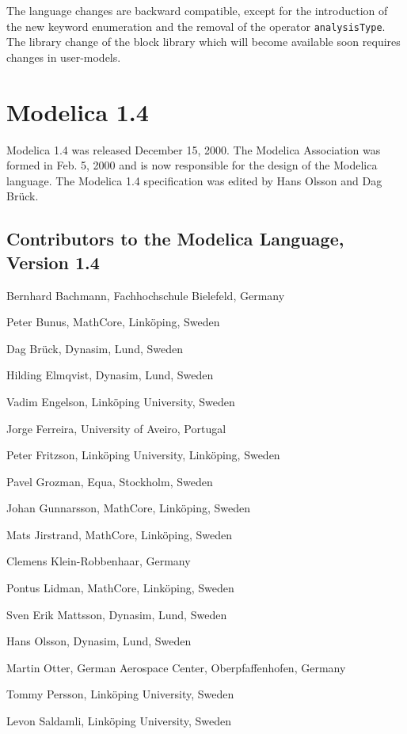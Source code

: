 The language changes are backward compatible, except for the introduction of the new keyword enumeration and the removal of the operator \lstinline!analysisType!.  The library change of the block library which will become available soon requires changes in user-models.

\section{Modelica 1.4}\label{modelica-1-4}

Modelica 1.4 was released December 15, 2000. The Modelica Association
was formed in Feb. 5, 2000 and is now responsible for the design of the
Modelica language. The Modelica 1.4 specification was edited by Hans
Olsson and Dag Brück.

\subsection{Contributors to the Modelica Language, Version 1.4}\label{contributors-to-the-modelica-language-version-1-4}

\indent\indent
Bernhard Bachmann, Fachhochschule Bielefeld, Germany

Peter Bunus, MathCore, Linköping, Sweden

Dag Brück, Dynasim, Lund, Sweden

Hilding Elmqvist, Dynasim, Lund, Sweden

Vadim Engelson, Linköping University, Sweden

Jorge Ferreira, University of Aveiro, Portugal

Peter Fritzson, Linköping University, Linköping, Sweden

Pavel Grozman, Equa, Stockholm, Sweden

Johan Gunnarsson, MathCore, Linköping, Sweden

Mats Jirstrand, MathCore, Linköping, Sweden

Clemens Klein-Robbenhaar, Germany

Pontus Lidman, MathCore, Linköping, Sweden

Sven Erik Mattsson, Dynasim, Lund, Sweden

Hans Olsson, Dynasim, Lund, Sweden

Martin Otter, German Aerospace Center, Oberpfaffenhofen, Germany

Tommy Persson, Linköping University, Sweden

Levon Saldamli, Linköping University, Sweden

